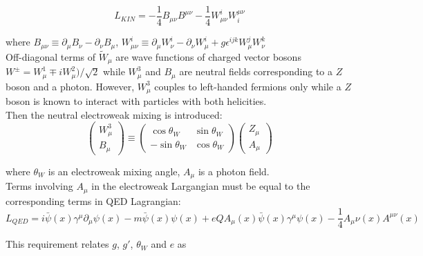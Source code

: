 \begin{equation} \label{eq:L_gauge_kin}
L_{KIN}=-\frac{1}{4}B_{\mu\nu}B^{\mu\nu}-\frac{1}{4}W_{\mu\nu}^i W^{\mu\nu}_i
\end{equation}

where $B_{\mu\nu} \equiv \partial_\mu B_\nu - \partial_\nu B_\mu$, $W_{\mu\nu}^i \equiv \partial_\mu W_\nu^i - \partial_\nu W_\mu^i + g \epsilon^{ijk} W_\mu^j W_\nu^k$\\

Off-diagonal terms of ${\tilde{W}}_\mu$ are wave functions of charged vector bosons $W^{\pm}=W_\mu^1 \mp i W_\mu^2)/{\sqrt{2}}$ while $W_\mu^3$ and $B_\mu$ are neutral fields corresponding to a $Z$ boson and a photon. However, $W_\mu^3$ couples to left-handed fermions only while a $Z$ boson is known to interact with particles with both helicities.\\

Then the neutral electroweak mixing is introduced:\\

\begin{equation}
  \begin{pmatrix} W_\mu^3 \\ B_\mu \end{pmatrix} \equiv
  \begin{pmatrix} \cos \theta_W & \sin \theta_W \\ -\sin \theta_W & \cos \theta_W \end{pmatrix}
  \begin{pmatrix} Z_\mu \\ A_\mu \end{pmatrix}
\end{equation} 

where $\theta_W$ is an electroweak mixing angle, $A_\mu$ is a photon field.\\

Terms involving $A_\mu$ in the electroweak Largangian must be equal to the corresponding terms in QED Lagrangian:\\

\begin{equation}\label{eq:L_QED}
L_{QED} = i \bar{\psi}(x) \gamma^\mu \partial_\mu \psi(x) - m \bar{\psi}(x) \psi(x) + e Q A_\mu(x) \bar{\psi}(x) \gamma^\mu \psi(x) - \frac{1}{4} A_\mu\nu(x) A^{\mu\nu}(x)
\end{equation}

This requirement relates $g$, $g'$, $\theta_W$ and $e$ as\\

